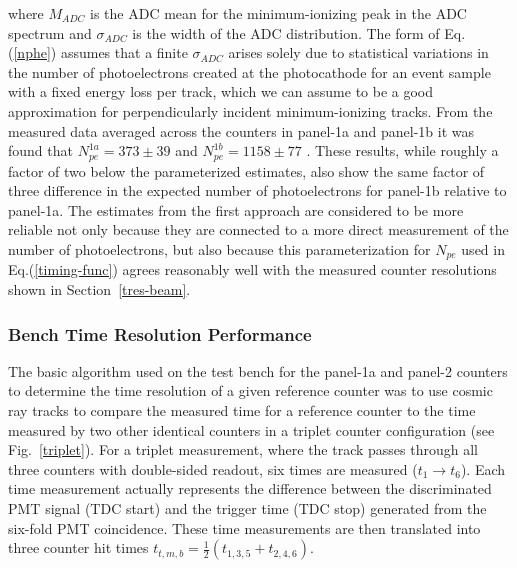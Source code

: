 \documentclass[3p,times,twocolumn]{elsarticle}
\begin{document}
\noindent
where $M_{ADC}$ is the ADC mean for the minimum-ionizing peak in the ADC spectrum and $\sigma_{ADC}$
is the width of the ADC distribution. The form of Eq.(\ref{nphe}) assumes that a finite $\sigma_{ADC}$
arises solely due to statistical variations in the number of photoelectrons created at the photocathode for
an event sample with a fixed energy loss per track, which we can assume to be a good approximation for
perpendicularly incident minimum-ionizing tracks. From the measured data averaged across the counters in
panel-1a and panel-1b it was found that $N_{pe}^{1a} = 373 \pm 39$ and $N_{pe}^{1b} = 1158 \pm 77$
\cite{pmt-currents}. These results, while roughly a factor of two below the parameterized estimates, also
show the same factor of three difference in the expected number of photoelectrons for panel-1b relative
to panel-1a. The estimates from the first approach are considered to be more reliable not only because they
are connected to a more direct measurement of the number of photoelectrons, but also because this
parameterization for $N_{pe}$ used in Eq.(\ref{timing-func}) agrees reasonably well with the measured
counter resolutions shown in Section~\ref{tres-beam}.

\subsubsection{Bench Time Resolution Performance}
\label{sec-bench}

The basic algorithm used on the test bench for the panel-1a and panel-2 counters to determine the time
resolution of a given reference counter was to use cosmic ray tracks to compare the measured time for a
reference counter to the time measured by two other identical counters in a triplet counter configuration
(see Fig.~\ref{triplet}). For a triplet measurement, where the track passes through all three counters with
double-sided readout, six times are measured ($t_1 \to t_6$). Each time measurement actually represents
the difference between the discriminated PMT signal (TDC start) and the trigger time (TDC stop)
generated from the six-fold PMT coincidence. These time measurements are then translated into three
counter hit times $t_{t,m,b} = \frac{1}{2}(t_{1,3,5} + t_{2,4,6})$.
\end{document}
